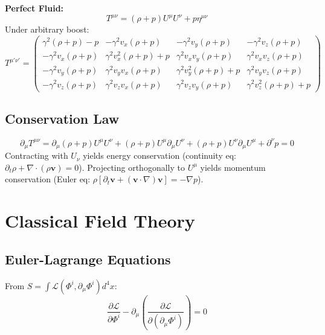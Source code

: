 \documentclass[11pt, a4paper]{report}
\begin{document}
\textbf{Perfect Fluid:}
\begin{equation}
T^{\mu\nu} = (\rho+p)U^\mu U^\nu + p\eta^{\mu\nu}
\end{equation}
Under arbitrary boost:
\begin{equation}
T^{\mu'\nu'} =
\begin{pmatrix}
\gamma^2(\rho + p) - p & -\gamma^2 v_x (\rho + p) & -\gamma^2 v_y (\rho + p) & -\gamma^2 v_z (\rho + p) \\
-\gamma^2 v_x (\rho + p) & \gamma^2 v_x^2 (\rho + p) + p & \gamma^2 v_x v_y (\rho + p) & \gamma^2 v_x v_z (\rho + p) \\
-\gamma^2 v_y (\rho + p) & \gamma^2 v_y v_x (\rho + p) & \gamma^2 v_y^2 (\rho + p) + p & \gamma^2 v_y v_z (\rho + p) \\
-\gamma^2 v_z (\rho + p) & \gamma^2 v_z v_x (\rho + p) & \gamma^2 v_z v_y (\rho + p) & \gamma^2 v_z^2 (\rho + p) + p
\end{pmatrix}
\end{equation}

\subsection*{Conservation Law}
\begin{equation}\label{eq:cons-T}
\partial_\mu T^{\mu\nu} = \partial_\mu (\rho + p) U^\mu U^\nu + (\rho + p) U^\mu \partial_\mu U^\nu + (\rho + p) U^\nu \partial_\mu U^\mu + \partial^\nu p = 0
\end{equation}
Contracting with $U_\nu$ yields energy conservation (continuity eq: $\partial_t \rho + \nabla \cdot (\rho \mathbf{v}) = 0$). Projecting orthogonally to $U^\mu$ yields momentum conservation (Euler eq: $\rho[\partial_t \mathbf{v} + (\mathbf{v}\cdot\nabla)\mathbf{v}] = -\nabla p$).

\section{Classical Field Theory}
\subsection*{Euler-Lagrange Equations}
From $S = \int \mathcal{L}(\Phi^i, \partial_\mu\Phi^i) d^4x$:
\begin{equation}
\frac{\partial\mathcal{L}}{\partial\Phi^i} - \partial_\mu\left(\frac{\partial\mathcal{L}}{\partial(\partial_\mu\Phi^i)}\right) = 0
\end{equation}
\end{document}
